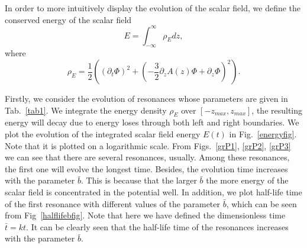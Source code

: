 In order to more intuitively display the evolution of the scalar field, we define the conserved energy of the scalar field~\cite{Pavlidou:2000cs}
\begin{equation}
E=\int_{-\infty}^{\infty}\rho_{E}dz,  \label{conserved energy}
\end{equation}
where
\begin{equation}
\rho_{E}=\frac{1}{2}\left((\partial_{t}\Phi)^2+ \left(-\frac{3}{2}\partial_{z}A(z)\Phi+\partial_{z}\Phi\right)^2 \right).  \label{energy density}
\end{equation}

Firstly, we consider the evolution of resonances whose parameters are given in Tab.~\ref{tab1}. We integrate the energy density $\rho_{E}$ over $[-z_{max},z_{max}]$, the resulting energy will decay due to energy loses through both left and right boundaries. We plot the evolution of the integrated scalar field energy $E(t)$ in Fig.~\ref{energyfig}. Note that it is plotted on a logarithmic scale. From Figs.~\ref{grP1}, \ref{grP2}, \ref{grP3} we can see that there are several resonances, usually. Among these resonances, the first one will evolve the longest time. Besides, the evolution time increases with the parameter $\bar{b}$. This is because that the larger $\bar{b}$ the more energy of the scalar field is concentrated in the potential well. In addition, we plot half-life time of the first resonance with different values of the parameter $\bar{b}$, which can be seen from Fig~\ref{halflifebfig}. Note that here we have defined the dimensionless time $\bar{t}=kt$. It can be clearly seen that the  half-life time of the resonances increases with the parameter $\bar{b}$.

\begin{figure*}
\centering
{}
\caption{Figures.~\ref{figenergy5}, \ref{figenergy10}, \ref{figenergy15} illustrate the energy of the scalar field vs. time for the evolution of the resonant modes for different values of the parameter $\bar{b}$. Here o1 represents the first odd-parity resonance, e1 represents the first even-parity resonance, and so on. Figure.~\ref{halflifebfig} depicts the relation between the half-life of the first scalar resonance and the parameter $\bar{b}$.}\label{energyfig}
\end{figure*}


